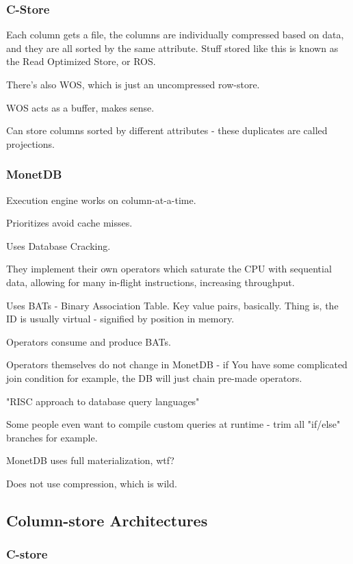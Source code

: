 \documentclass{article}
\begin{document}
		\subsubsection{C-Store}
		
			Each column gets a file, the columns are individually compressed based on data, and they are all sorted by the same attribute. Stuff stored like this is known as the Read Optimized Store, or ROS.
			
			There's also WOS, which is just an uncompressed row-store.
			
			WOS acts as a buffer, makes sense.
			
			Can store columns sorted by different attributes - these duplicates are called projections.
			
		\subsubsection{MonetDB}
		
			Execution engine works on column-at-a-time.
			
			Prioritizes avoid cache misses.
			
			Uses Database Cracking.
			
			They implement their own operators which saturate the CPU with sequential data, allowing for many in-flight instructions, increasing throughput.
			
			Uses BATs - Binary Association Table. Key value pairs, basically. Thing is, the ID is usually virtual - signified by position in memory.
			
			Operators consume and produce BATs.
			
			Operators themselves do not change in MonetDB - if You have some complicated join condition for example, the DB will just chain pre-made operators.
			
			"RISC approach to database query languages"
			
			Some people even want to compile custom queries at runtime - trim all "if/else" branches for example.
			
			MonetDB uses full materialization, wtf?
			
			Does not use compression, which is wild.
			
	\subsection{Column-store Architectures}
	
		\subsubsection{C-store}
		
\end{document}
